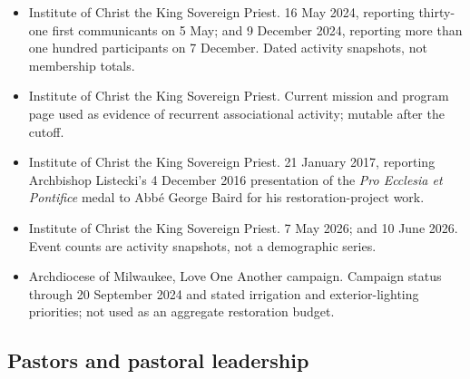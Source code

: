 \begin{itemize}[leftmargin=1.35em,itemsep=0.2em,topsep=0.2em]
\item Institute of Christ the King Sovereign Priest.  16 May 2024, reporting thirty-one first communicants on 5 May; and  9 December 2024, reporting more than one hundred participants on 7 December. Dated activity snapshots, not membership totals.
\item Institute of Christ the King Sovereign Priest.  Current mission and program page used as evidence of recurrent associational activity; mutable after the cutoff.
\item Institute of Christ the King Sovereign Priest.  21 January 2017, reporting Archbishop Listecki's 4 December 2016 presentation of the \emph{Pro Ecclesia et Pontifice} medal to Abb\'e George Baird for his restoration-project work.
\item Institute of Christ the King Sovereign Priest.  7 May 2026; and  10 June 2026. Event counts are activity snapshots, not a demographic series.
\item Archdiocese of Milwaukee, Love One Another campaign.  Campaign status through 20 September 2024 and stated irrigation and exterior-lighting priorities; not used as an aggregate restoration budget.
\end{itemize}

\subsection{Pastors and pastoral leadership}

